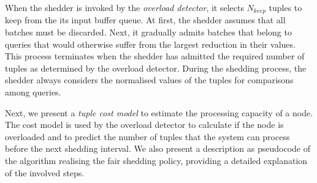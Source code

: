 When the shedder is invoked by the \emph{overload detector}, it selects
$N_{keep}$ tuples to keep from the its input buffer queue.  At first, the shedder
assumes that all batches must be discarded. Next, it gradually admits batches
that belong to queries that would otherwise suffer from the largest
reduction in their \sic values. This process terminates when the shedder has
admitted the required number of tuples as determined by the overload detector.
During the shedding process, the shedder always considers the normalised
\sic values of the tuples for comparisons among queries. 

Next, we present a \emph{tuple cost model} to estimate the
processing capacity of a node. The cost model is used by the overload detector to calculate if the node
is overloaded and to predict the number of
tuples that the system can process before the next shedding interval.
We also present a description as pseudocode of the algorithm realising the
fair shedding policy, providing a detailed explanation of the involved steps.

